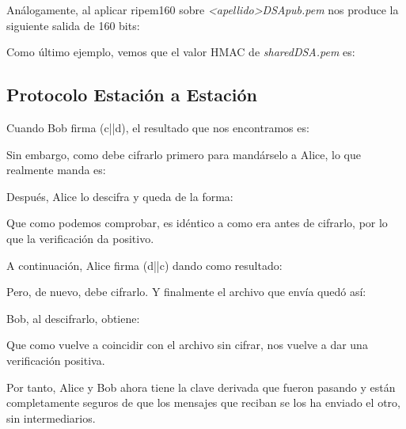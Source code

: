 \documentclass[a4paper, 11pt]{article}
\begin{document}
		Análogamente, al aplicar ripem160 sobre \textit{<apellido>DSApub.pem} nos produce la siguiente salida de 160 bits:
		
		
		Como último ejemplo, vemos que el valor HMAC de \textit{sharedDSA.pem} es:
		

	\subsection{Protocolo Estación a Estación}
		Cuando Bob firma (c||d), el resultado que nos encontramos es:
		

		Sin embargo, como debe cifrarlo primero para mandárselo a Alice, lo que realmente manda es:
		
		
		Después, Alice lo descifra y queda de la forma:
		
		
		Que como podemos comprobar, es idéntico a como era antes de cifrarlo, por lo que la verificación da positivo.
		
		A continuación, Alice firma (d||c) dando como resultado:
		
		
		Pero, de nuevo, debe cifrarlo. Y finalmente el archivo que envía quedó así:
		
		
		Bob, al descifrarlo, obtiene:
		
		
		Que como vuelve a coincidir con el archivo sin cifrar, nos vuelve a dar una verificación positiva.
		
		Por tanto, Alice y Bob ahora tiene la clave derivada que fueron pasando y están completamente seguros de que los
		mensajes que reciban se los ha enviado el otro, sin intermediarios.
	
\end{document}
